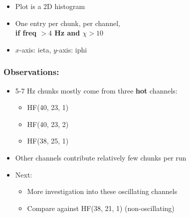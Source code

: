 \documentclass[bigger]{beamer}
\providecommand{\alert}[1]{\textbf{#1}}
\begin{document}
\begin{frame}
\begin{itemize}
\item Plot is a 2D histogram
\label{sec-3-3-1-2}%

\item One entry per chunk, per channel,\\ \alert{if freq $> 4$ Hz and $\chi > 10$}
\label{sec-3-3-1-3}%

\item $x$-axis: ieta, $y$-axis: iphi
\label{sec-3-3-1-4}%
\end{itemize} %
\end{frame}
\begin{frame}
\frametitle{Observations:}
\label{sec-3-3-2}
\begin{itemize}

\item 5-7 Hz chunks mostly come from three \alert{hot} channels:
\label{sec-3-3-2-1}%
\begin{itemize}

\item HF(40, 23, 1)
\label{sec-3-3-2-1-1}%

\item HF(40, 23, 2)
\label{sec-3-3-2-1-2}%

\item HF(38, 25, 1)
\label{sec-3-3-2-1-3}%
\end{itemize} %

\item Other channels contribute relatively few chunks per run
\label{sec-3-3-2-2}%

\item Next:
\label{sec-3-3-2-3}%
\begin{itemize}

\item More investigation into these oscillating channels
\label{sec-3-3-2-3-1}%

\item Compare against HF(38, 21, 1) (non-oscillating)
\label{sec-3-3-2-3-2}%
\end{itemize} %
\end{itemize} %
\end{frame}
\end{document}
